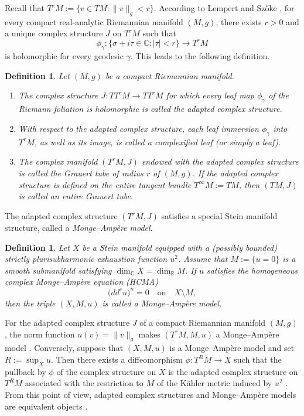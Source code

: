 \documentclass[a4paper, 12pt]{article}
\newtheorem{defn}[thm]{Definition}
\begin{document}
Recall that $T^rM:=\{v\in TM:\|v\|_g<r\}$. According to Lempert and Sz\H{o}ke \cite{S91,LS91}, for every compact real-analytic Riemannian manifold $(M,g)$, there exists $r>0$ and a unique complex structure $J$ on $T^rM$ such that
\[
\phi_\gamma:\{\sigma+i\tau\in\mathbb{C}:|\tau|<r\}\longrightarrow T^rM
\]
is holomorphic for every geodesic $\gamma$. This leads to the following definition.

\begin{defn}
Let $(M,g)$ be a compact Riemannian manifold.
\begin{enumerate}
    \item The complex structure $J:TT^rM\longrightarrow TT^rM$ for which every leaf map $\phi_\gamma$ of the Riemann foliation is holomorphic is called the \emph{adapted complex structure}.
    \item With respect to the adapted complex structure, each leaf immersion $\phi_\gamma$ into $T^rM$, as well as its image, is called a \emph{complexified leaf} (or simply a \emph{leaf}).
    \item The complex manifold $(T^rM,J)$ endowed with the adapted complex structure is called the \emph{Grauert tube of radius $r$} of $(M,g)$. If the adapted complex structure is defined on the entire tangent bundle $T^\infty M:=TM$, then $(TM,J)$ is called an \emph{entire Grauert tube}.
\end{enumerate}
\end{defn}

The adapted complex structure $(T^r M,J)$ satisfies a special Stein manifold structure, called a \emph{Monge--Amp\`ere model}.

\begin{defn}
Let $X$ be a Stein manifold equipped with a (possibly bounded) strictly plurisubharmonic exhaustion function $u^2$. Assume that $M:=\{u=0\}$ is a smooth submanifold satisfying $\dim_{\mathbb{C}}X=\dim_{\mathbb{R}}M$. If $u$ satisfies the homogeneous complex Monge--Amp\`ere equation (HCMA)
\[
\bigl(dd^c u\bigr)^n=0\quad\text{on}\quad X\setminus M,
\]
then the triple $(X,M,u)$ is called a \emph{Monge--Amp\`ere model}.
\end{defn}

For the adapted complex structure $J$ of a compact Riemannian manifold $(M,g)$, the norm function $u(v)=\|v\|_g$ makes $(T^r M,M,u)$ a Monge--Amp\`ere model \cite[Theorem 5.6]{LS91}. Conversely, suppose that $(X,M,u)$ is a Monge--Amp\`ere model and set $R:=\sup_Xu$. Then there exists a diffeomorphism $\phi:T^RM\to X$ such that the pullback by $\phi$ of the complex structure on $X$ is the adapted complex structure on $T^RM$ associated with the restriction to $M$ of the K\"ahler metric induced by $u^2$ \cite[Theorem 3.1]{LS91}. From this point of view, adapted complex structures and Monge--Amp\`ere models are equivalent objects \cite[Section 5]{LS91}.
\end{document}
